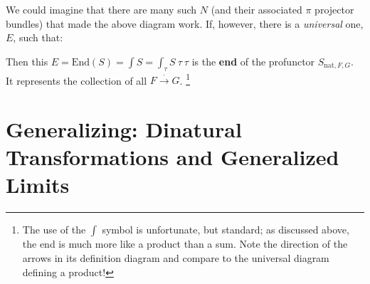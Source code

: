 \documentclass[letterpaper]{article}
\begin{document}
We could imagine that there are many such $N$ (and their associated $\pi$
projector bundles) that made the above diagram work.  If, however, there is
a {\em universal} one, $E$, such that:
%
\begin{center}\end{center}
%
Then this $E = \text{End}(S) = \int S = \int_\tau S~\tau~\tau$ is the
\textbf{end} of the profunctor $S_{\text{nat},F,G}$.  It represents the
collection of all $F \stackrel{\cdot}{\to} G$.%
%
\footnote{The use of the $\int$ symbol is unfortunate, but standard; as
discussed above, the end is much more like a product than a sum.  Note the
direction of the arrows in its definition diagram and compare to the
universal diagram defining a product!}

\section{Generalizing: Dinatural Transformations and Generalized Limits}
\end{document}
